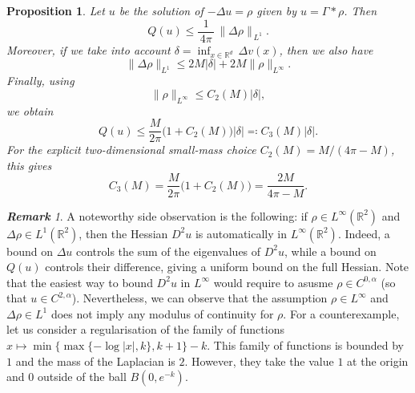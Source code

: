 \documentclass[11pt,a4paper]{article}
\numberwithin{equation}{section}
\theoremstyle{plain}
\newtheorem{proposition}[theorem]{Proposition}
\theoremstyle{remark}
\newtheorem{remark}[theorem]{\bf Remark}
\newcommand {\f}{\frac}
\begin{document}
\begin{proposition}%
\label{prop:estimate_Linf_difference}
Let $u$ be the solution of $-\Delta u=\rho$ given by $u=\Gamma*\rho$. Then
\[
Q(u)
 \le 
\f{1}{\,4\pi\,}\,\|\Delta \rho\|_{\,L^1}.
\]
 Moreover, if we take into account $\delta =  \inf_{x \in \mathbb{R}^d}\,\Delta v(x)$, then we also have
\[
\|\Delta \rho\|_{L^1}
 \le 
2M|\delta| + 2M\|\rho\|_{L^\infty}.
\]
Finally, using
\[
\|\rho\|_{L^\infty}
    \le C_2(M)|\delta|,
\]
we obtain
\[
Q(u)
\le
\frac{M}{2\pi}
\bigl(1+C_2(M)\bigr)|\delta|
\eqqcolon
C_3(M)|\delta|.
\]
For the explicit two-dimensional small-mass choice
$C_2(M)=M/(4\pi-M)$, this gives
\[
C_3(M)
=
\frac{M}{2\pi}
\bigl(1+C_2(M)\bigr)
=
\frac{2M}{4\pi-M}.
\]
\end{proposition}


\begin{remark}\label{rem:corollary}
A noteworthy side observation is the following: if $\rho \in L^\infty(\mathbb{R}^2)$ and $\Delta\rho \in L^{1}(\mathbb{R}^2)$, then the Hessian $D^2 u$ is automatically in $L^\infty(\mathbb{R}^2)$. Indeed, a bound on $\Delta u$ controls the sum of the eigenvalues of $D^2 u$, while a bound on $Q(u)$ controls their difference, giving a uniform bound on the full Hessian. Note that the easiest way to bound $D^2u$ in $L^\infty$ would require to asusme $\rho\in C^{0,\alpha}$ (so that $u\in C^{2,\alpha}$).
Nevertheless, we can observe that the assumption $\rho \in L^\infty$ and $\Delta\rho \in L^{1}$ does not imply any modulus of continuity for $\rho$. For a counterexample, let us consider a regularisation of the family of functions $x\mapsto \min\{\max\{-\log|x|,k\},k+1\}-k$. This family of functions is bounded by $1$ and the mass of the Laplacian is $2$. However, they take the value $1$ at the origin and $0$ outside of the ball $B(0,e^{-k})$.
\end{remark}
\end{document}

